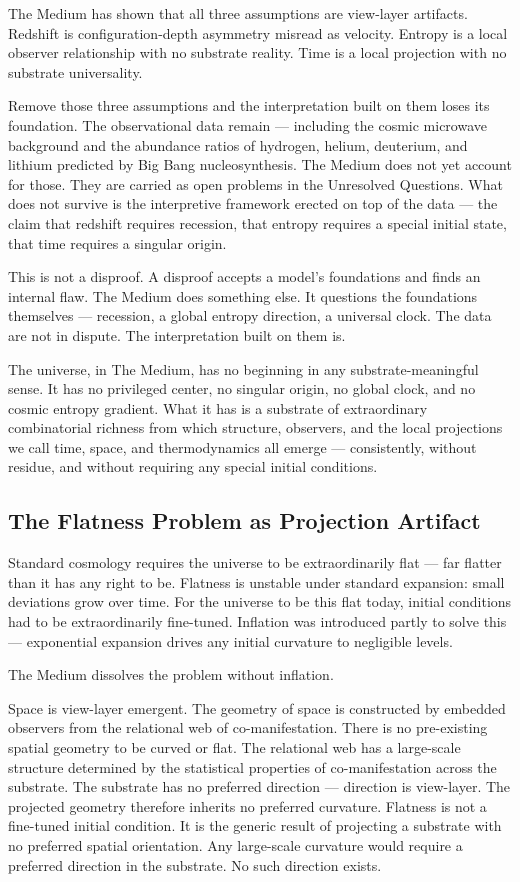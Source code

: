 \documentclass[11pt,letterpaper]{article}
\begin{document}
The Medium has shown that all three assumptions are view-layer artifacts. Redshift is configuration-depth asymmetry misread as velocity. Entropy is a local observer relationship with no substrate reality. Time is a local projection with no substrate universality.

Remove those three assumptions and the interpretation built on them loses its foundation. The observational data remain --- including the cosmic microwave background and the abundance ratios of hydrogen, helium, deuterium, and lithium predicted by Big Bang nucleosynthesis. The Medium does not yet account for those. They are carried as open problems in the Unresolved Questions. What does not survive is the interpretive framework erected on top of the data --- the claim that redshift requires recession, that entropy requires a special initial state, that time requires a singular origin.

This is not a disproof. A disproof accepts a model's foundations and finds an internal flaw. The Medium does something else. It questions the foundations themselves --- recession, a global entropy direction, a universal clock. The data are not in dispute. The interpretation built on them is.

The universe, in The Medium, has no beginning in any substrate-meaningful sense. It has no privileged center, no singular origin, no global clock, and no cosmic entropy gradient. What it has is a substrate of extraordinary combinatorial richness from which structure, observers, and the local projections we call time, space, and thermodynamics all emerge --- consistently, without residue, and without requiring any special initial conditions.

\subsection{The Flatness Problem as Projection Artifact}
\label{sec:org075245e}

Standard cosmology requires the universe to be extraordinarily flat --- far flatter than it has any right to be. Flatness is unstable under standard expansion: small deviations grow over time. For the universe to be this flat today, initial conditions had to be extraordinarily fine-tuned. Inflation was introduced partly to solve this --- exponential expansion drives any initial curvature to negligible levels.

The Medium dissolves the problem without inflation.

Space is view-layer emergent. The geometry of space is constructed by embedded observers from the relational web of co-manifestation. There is no pre-existing spatial geometry to be curved or flat. The relational web has a large-scale structure determined by the statistical properties of co-manifestation across the substrate. The substrate has no preferred direction --- direction is view-layer. The projected geometry therefore inherits no preferred curvature. Flatness is not a fine-tuned initial condition. It is the generic result of projecting a substrate with no preferred spatial orientation. Any large-scale curvature would require a preferred direction in the substrate. No such direction exists.
\end{document}
